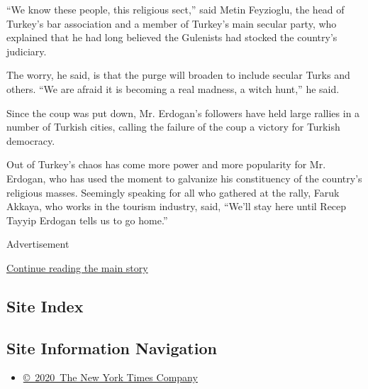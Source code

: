 ``We know these people, this religious sect,'' said Metin Feyzioglu, the
head of Turkey's bar association and a member of Turkey's main secular
party, who explained that he had long believed the Gulenists had stocked
the country's judiciary.

The worry, he said, is that the purge will broaden to include secular
Turks and others. ``We are afraid it is becoming a real madness, a witch
hunt,'' he said.

Since the coup was put down, Mr. Erdogan's followers have held large
rallies in a number of Turkish cities, calling the failure of the coup a
victory for Turkish democracy.

Out of Turkey's chaos has come more power and more popularity for Mr.
Erdogan, who has used the moment to galvanize his constituency of the
country's religious masses. Seemingly speaking for all who gathered at
the rally, Faruk Akkaya, who works in the tourism industry, said,
``We'll stay here until Recep Tayyip Erdogan tells us to go home.''

Advertisement

\protect\hyperlink{after-bottom}{Continue reading the main story}

\hypertarget{site-index}{%
\subsection{Site Index}\label{site-index}}

\hypertarget{site-information-navigation}{%
\subsection{Site Information
Navigation}\label{site-information-navigation}}

\begin{itemize}
\tightlist
\item
  \href{https://help.nytimes.com/hc/en-us/articles/115014792127-Copyright-notice}{©~2020~The
  New York Times Company}
\end{itemize}

